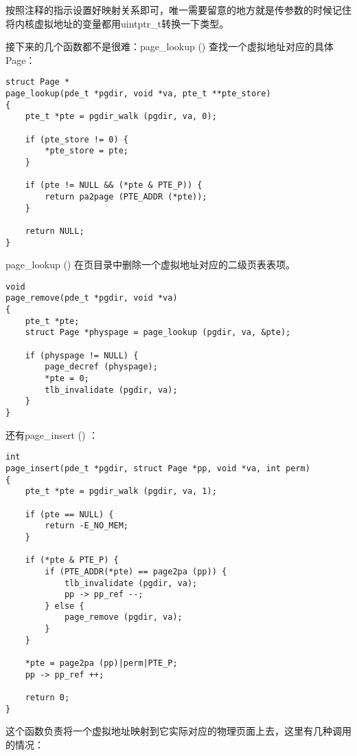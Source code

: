 \documentclass{article}
\newcommand{\funcname}[1]{{\ttfamily \small #1}}
\begin{document}
\begin{CJK*}{UTF8}{gkai}
按照注释的指示设置好映射关系即可，唯一需要留意的地方就是传参数的时候记住将内核虚拟地址的变量都用uintptr\_t转换一下类型。

接下来的几个函数都不是很难：\funcname{page\_lookup ()} 查找一个虚拟地址对应的具体Page：

\begin{lstlisting}[style=ccode, title={\scriptsize \ttfamily \bfseries kern/pmap.c: page\_lookup ()}]
struct Page *
page_lookup(pde_t *pgdir, void *va, pte_t **pte_store)
{
    pte_t *pte = pgdir_walk (pgdir, va, 0);

    if (pte_store != 0) {
        *pte_store = pte;
    }

    if (pte != NULL && (*pte & PTE_P)) {
        return pa2page (PTE_ADDR (*pte));
    }
    
	return NULL;
}
\end{lstlisting}

\funcname{page\_lookup ()} 在页目录中删除一个虚拟地址对应的二级页表表项。

\begin{lstlisting}[style=ccode, title={\scriptsize \ttfamily \bfseries kern/pmap.c: page\_remove ()}]
void
page_remove(pde_t *pgdir, void *va)
{
    pte_t *pte;
    struct Page *physpage = page_lookup (pgdir, va, &pte);

    if (physpage != NULL) {
        page_decref (physpage);
        *pte = 0;
        tlb_invalidate (pgdir, va);
    }
}
\end{lstlisting}

还有\funcname{page\_insert () }：

\begin{lstlisting}[style=ccode, title={\scriptsize \ttfamily \bfseries kern/pmap.c: boot\_alloc ()}]
int
page_insert(pde_t *pgdir, struct Page *pp, void *va, int perm) 
{
    pte_t *pte = pgdir_walk (pgdir, va, 1);

    if (pte == NULL) {
        return -E_NO_MEM;
    }

    if (*pte & PTE_P) {
        if (PTE_ADDR(*pte) == page2pa (pp)) {
            tlb_invalidate (pgdir, va);
            pp -> pp_ref --;
        } else {
            page_remove (pgdir, va);
        }
    }
    
    *pte = page2pa (pp)|perm|PTE_P;
    pp -> pp_ref ++;

    return 0;
}
\end{lstlisting}

这个函数负责将一个虚拟地址映射到它实际对应的物理页面上去，这里有几种调用的情况：


\end{CJK*}
\end{document}

